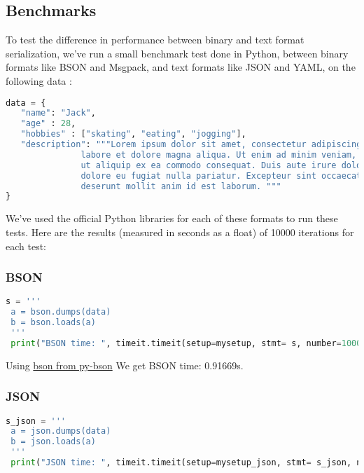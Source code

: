 \documentclass[12pt]{article}
\begin{document}
\subsection{Benchmarks}\label{benchmarks}
To test the difference in performance between binary and text format serialization, we’ve run a small benchmark test done in Python, between binary formats like BSON and Msgpack, and text formats like JSON and YAML, on the following data :

\begin{lstlisting}[language=python]
data = {
   "name": "Jack",
   "age" : 28,
   "hobbies" : ["skating", "eating", "jogging"],
   "description": """Lorem ipsum dolor sit amet, consectetur adipiscing elit, sed do eiusmod tempor incididunt ut
               labore et dolore magna aliqua. Ut enim ad minim veniam, quis nostrud exercitation ullamco laboris nisi
               ut aliquip ex ea commodo consequat. Duis aute irure dolor in reprehenderit in voluptate velit esse cillum
               dolore eu fugiat nulla pariatur. Excepteur sint occaecat cupidatat non proident, sunt in culpa qui officia
               deserunt mollit anim id est laborum. """
}
\end{lstlisting}

 We’ve used the official Python libraries for each of these formats to run these tests. Here are the results (measured in seconds as a float) of 10000 iterations for each test:
 \hfill\break

\subsubsection{BSON}
\begin{lstlisting}[language=python]
 s = '''
 a = bson.dumps(data)
 b = bson.loads(a)
 '''
 print("BSON time: ", timeit.timeit(setup=mysetup, stmt= s, number=10000))
\end{lstlisting}

Using \href{https://github.com/py-bson/bson}{bson from py-bson}
We get BSON time:  0.91669s.

\subsubsection{JSON}
\begin{lstlisting}[language=python]
  s_json = '''
 a = json.dumps(data)
 b = json.loads(a)
 '''
 print("JSON time: ", timeit.timeit(setup=mysetup_json, stmt= s_json, number=10000))
\end{lstlisting}
\end{document}
